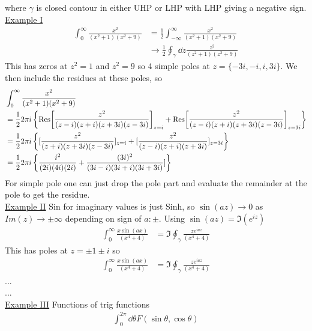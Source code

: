 \documentclass[a4paper,12pt]{article}
\begin{document}
where $\gamma$ is closed contour in either UHP or LHP with LHP giving a negative sign.\\
\underline{Example I}
\begin{equation}
\begin{aligned}
\int_{0}^{\infty}\frac{x^2}{(x^2+1)(x^2+9)}&=\frac{1}{2}\int_{-\infty}^{\infty}\frac{x^2}{(x^2+1)(x^2+9)}\\
&\to \frac{1}{2}\oint_\gamma \dd z \frac{z^2}{(z^2+1)(z^2+9)}
\end{aligned}
\end{equation}
This has zeros at $z^2=1$ and $z^2=9$ so 4 simple poles at $z=\{-3i,-i,i,3i\}$. We then include the residues at these poles, so
\begin{equation}
\begin{aligned}
	&\int_{0}^{\infty}\frac{x^2}{(x^2+1)(x^2+9)}\\
	&=\frac{1}{2}2\pi i \left\{
	\Res[\frac{z^2}{(z-i)(z+i)(z+3i)(z-3i)}]_{z=i}+	\Res[\frac{z^2}{(z-i)(z+i)(z+3i)(z-3i)}]_{z=3i}
	\right\}\\
	&=\frac{1}{2}2\pi i \left\{[\frac{z^2}{(z+i)(z+3i)(z-3i)}]_{z=i}+	[\frac{z^2}{(z-i)(z+i)(z+3i)}]_{z=3i}
	\right\}\\
	&=\frac{1}{2}2\pi i \left\{\frac{i^2}{(2i)(4i)(2i)}+\frac{(3i)^2}{(3i-i)(3i+i)(3i+3i)}]
	\right\}
\end{aligned}
\end{equation}
For simple pole one can just drop the pole part and evaluate the remainder at the pole to get the residue.\\
\underline{Example II}
Sin for imaginary values is just Sinh, so $\sin(a z)\to 0$ as $Im(z)\to \pm\infty$ depending on sign of $a:\pm$. Using $\sin(az)=\Im(e^{iz})$
\begin{equation}
	\begin{aligned}
		\int_{0}^{\infty}\frac{x \sin(a x)}{(x^4+4)}&=\Im \oint_\gamma \frac{z e^{iaz}}{(x^4+4)}
	\end{aligned}
\end{equation}
This has poles at $z=\pm 1 \pm i$ so
\begin{equation}
	\begin{aligned}
		\int_{0}^{\infty}\frac{x \sin(a x)}{(x^4+4)}&=\Im \oint_\gamma \frac{z e^{iaz}}{(x^4+4)}
	\end{aligned}
\end{equation}
...\\
...\\
\underline{Example III}
Functions of trig functions
\begin{equation}
	\begin{aligned}
		\int_{0}^{2\pi} \dd \theta F(\sin \theta, \cos \theta )
	\end{aligned}
\end{equation}
\end{document}
